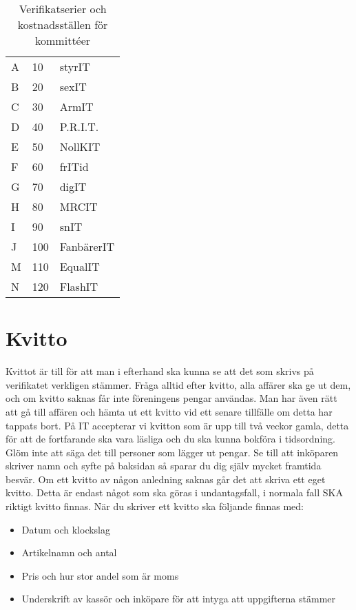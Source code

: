 \documentclass{article}
\begin{document}
\begin{table}[h]
\centering
\caption{Verifikatserier och kostnadsställen för kommittéer}
\label{committee-verifikat}
\begin{tabular}{lll}
A & 10 & styrIT     \\
B & 20 & sexIT      \\
C & 30 & ArmIT      \\
D & 40 & P.R.I.T.   \\
E & 50 & NollKIT    \\
F & 60 & frITid     \\
G & 70 & digIT      \\
H & 80 & MRCIT \\
I & 90 & snIT       \\
J & 100 & FanbärerIT \\
M & 110 & EqualIT \\
N & 120 & FlashIT \\
\end{tabular}
\end{table}


\section{Kvitto}
Kvittot är till för att man i efterhand ska kunna se att det som skrivs på verifikatet verkligen stämmer. Fråga alltid efter kvitto, alla affärer ska ge ut dem, och om kvitto saknas får inte föreningens pengar användas. Man har även rätt att gå till affären och hämta ut ett kvitto
vid ett senare tillfälle om detta har tappats bort.
På IT accepterar vi kvitton som är upp till två veckor gamla, detta för att de fortfarande ska vara läsliga och du ska kunna bokföra i tidsordning. Glöm inte att säga det till personer som lägger ut pengar. Se till att inköparen skriver namn och syfte på baksidan så sparar du dig själv
mycket framtida besvär. Om ett kvitto av någon anledning saknas går det att skriva ett eget kvitto. Detta är
endast något som ska göras i undantagsfall, i normala fall SKA riktigt kvitto finnas. När du
skriver ett kvitto ska följande finnas med:

\begin{itemize}
    \item Datum och klockslag
    \item Artikelnamn och antal
    \item Pris och hur stor andel som är moms
    \item Underskrift av kassör och inköpare för att intyga att uppgifterna stämmer
\end{itemize}
\end{document}
